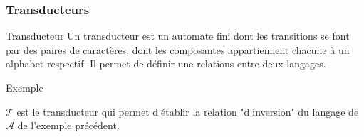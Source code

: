 \documentclass{beamer}
\begin{document}
\begin{frame}
\frametitle{Transducteurs}
\begin{block}{Transducteur}
Un transducteur est un automate fini dont les transitions se font par des paires de caractères, dont les composantes appartiennent chacune à un alphabet respectif. Il permet de définir une relations entre deux langages.
\end{block}
\begin{exampleblock}{Exemple}
\begin{figure}[H]
\centering
{}
\end{figure}
$\mathcal{T}$ est le transducteur qui permet d'établir la relation "d'inversion" du langage de $\mathcal{A}$ de l'exemple précédent.
\end{exampleblock}
\end{frame}
\end{document}
